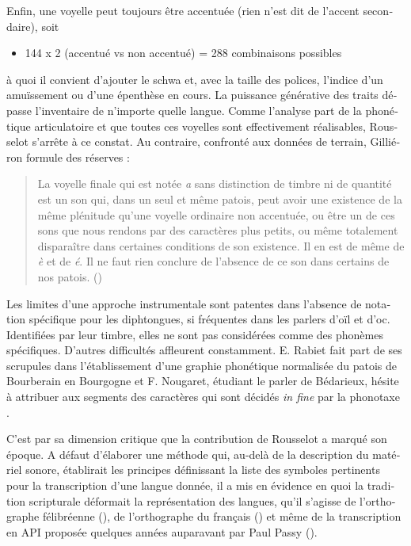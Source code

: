 \documentclass[french,output=paper,colorlinks,citecolor=brown]{../langscibook}
\begin{document}
\begin{otherlanguage}{french}
Enfin, une voyelle peut toujours être accentuée (rien n’est dit de l’accent secondaire), soit

\begin{itemize}
      \item 144 x 2 (accentué vs non accentué) = 288 combinaisons possibles 
\end{itemize}

à quoi il convient d’ajouter le schwa et, avec la taille des polices, l’indice d’un amuïssement ou d’une épenthèse en cours. La puissance générative des traits dépasse l’inventaire de n’importe quelle langue. Comme l’analyse part de la phonétique articulatoire et que toutes ces voyelles sont effectivement réalisables, Rousselot s’arrête à ce constat. Au contraire, confronté aux données de terrain, Gilliéron formule des réserves :

\begin{quote}
    La voyelle finale qui est notée \textit{a} sans distinction de timbre ni de quantité est un son qui, dans un seul et même patois, peut avoir une existence de la même plénitude qu’une voyelle ordinaire non accentuée, ou être un de ces sons que nous rendons par des caractères plus petits, ou même totalement disparaître dans certaines conditions de son existence. Il en est de même de \textit{è} et de \textit{é}. Il ne faut rien conclure de l’absence de ce son dans certains de nos patois. (\citealt[33--34n]{Gilliéron1888})
\end{quote}

Les limites d’une approche instrumentale sont patentes dans l’absence de notation spécifique pour les diphtongues, si fréquentes dans les parlers d’oïl et d’oc. Identifiées par leur timbre, elles ne sont pas considérées comme des phonèmes spécifiques. D’autres difficultés affleurent constamment. E. Rabiet fait part de ses scrupules dans l’établissement d’une graphie phonétique normalisée du patois de Bourberain en Bourgogne \citeyear[243]{Rabiet1887} et F. Nougaret, étudiant le parler de Bédarieux, hésite à attribuer aux segments des caractères qui sont décidés \textit{in fine} par la phonotaxe \citeyear[216]{Nougaret1890}.

C’est par sa dimension critique que la contribution de Rousselot a marqué son époque. A défaut d’élaborer une méthode qui, au-delà de la description du matériel sonore, établirait les principes définissant la liste des symboles pertinents pour la transcription d’une langue donnée, il a mis en évidence en quoi la tradition scripturale déformait la représentation des langues, qu’il s’agisse de l’orthographe félibréenne (\citealt[II-158]{Rousselot1887}), de l’orthographe du français (\citealt[III-239]{Rousselot1887}) et même de la transcription en API proposée quelques années auparavant par Paul Passy (\citealt[III-238]{Rousselot1887}).


\end{otherlanguage}
\end{document}
